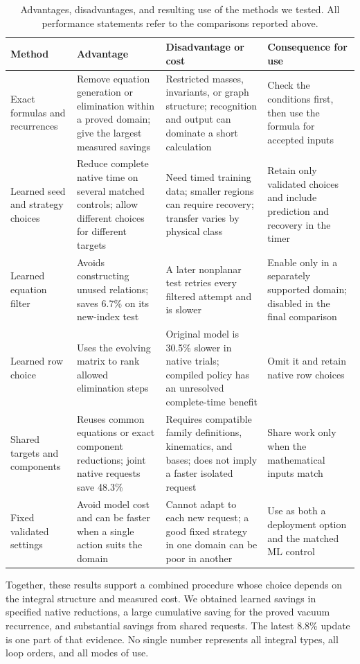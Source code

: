 \begin{table}[!htbp]\centering\small
\caption{Advantages, disadvantages, and resulting use of the methods we tested. All performance statements refer to the comparisons reported above.}
\label{tab:tradeoffs}
\begin{tabularx}{\linewidth}{@{}>{\raggedright\arraybackslash}p{2.5cm}YYY@{}}\toprule
Method & Advantage & Disadvantage or cost & Consequence for use\\\midrule
Exact formulas and recurrences & Remove equation generation or elimination within a proved domain; give the largest measured savings & Restricted masses, invariants, or graph structure; recognition and output can dominate a short calculation & Check the conditions first, then use the formula for accepted inputs\\
Learned seed and strategy choices & Reduce complete native time on several matched controls; allow different choices for different targets & Need timed training data; smaller regions can require recovery; transfer varies by physical class & Retain only validated choices and include prediction and recovery in the timer\\
Learned equation filter & Avoids constructing unused relations; saves 6.7\% on its new-index test & A later nonplanar test retries every filtered attempt and is slower & Enable only in a separately supported domain; disabled in the final comparison\\
Learned row choice & Uses the evolving matrix to rank allowed elimination steps & Original model is 30.5\% slower in native trials; compiled policy has an unresolved complete-time benefit & Omit it and retain native row choices\\
Shared targets and components & Reuses common equations or exact component reductions; joint native requests save 48.3\% & Requires compatible family definitions, kinematics, and bases; does not imply a faster isolated request & Share work only when the mathematical inputs match\\
Fixed validated settings & Avoid model cost and can be faster when a single action suits the domain & Cannot adapt to each new request; a good fixed strategy in one domain can be poor in another & Use as both a deployment option and the matched ML control\\\bottomrule
\end{tabularx}
\end{table}

Together, these results support a combined procedure whose choice depends on the integral structure and measured cost. We obtained learned savings in specified native reductions, a large cumulative saving for the proved vacuum recurrence, and substantial savings from shared requests. The latest 8.8\% update is one part of that evidence. No single number represents all integral types, all loop orders, and all modes of use.
\FloatBarrier
